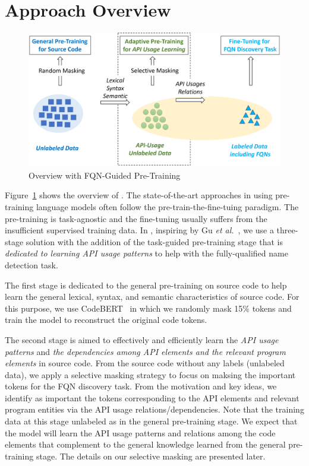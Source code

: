 \section{Approach Overview}
\label{sec:overview}

\begin{figure}[t] %
	\centering
	\includegraphics[width=\linewidth]{overview}
        \vspace{-3pt}
	\caption{{\tool} Overview with FQN-Guided Pre-Training}
	\label{fig:overview}
\end{figure}

Figure~\ref{fig:overview} shows the overview of {\tool}.  The
state-of-the-art approaches in using pre-training language models
often follow the pre-train-the-fine-tuing paradigm. The pre-training
is task-agnostic and the fine-tuning usually suffers from the
insufficient supervised training data. In {\tool}, inspiring by Gu
{\em et al.}~\cite{gu-emnlp20}, we use a three-stage solution with the
addition of the task-guided pre-training stage that is {\em dedicated
  to learning API usage patterns} to help with the fully-qualified
name detection task.

The first stage is dedicated to the general pre-training on source
code to help {\tool} learn the general lexical, syntax, and semantic
characteristics of source code. For this purpose, we use
CodeBERT~\cite{} in which we randomly mask 15\% tokens and train the
model to reconstruct the original code tokens.

The second stage is aimed to effectively and efficiently learn the
{\em API usage patterns} and {\em the dependencies among API elements
  and the relevant program elements} in source code. From the source
code without any labels (unlabeled data), we apply a selective masking
strategy to focus on maksing the important tokens for the FQN
discovery task. From the motivation and key ideas, we identify as
important the tokens corresponding to the API elements and relevant
program entities via the API usage relations/dependencies. Note that
the training data at this stage unlabeled as in the general
pre-training stage. We expect that the model will learn the API usage
patterns and relations among the code elements that complement to the
general knowledge learned from the general pre-training stage. The
details on our selective masking are presented later.

